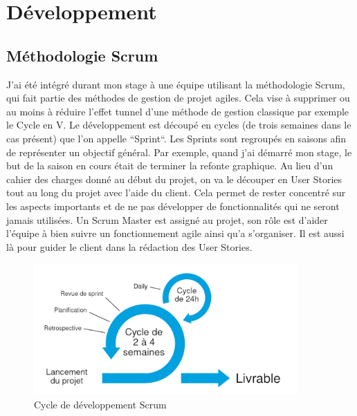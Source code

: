\documentclass[12pt, a4paper]{report}
\begin{document}
\chapter{Développement}
    \section{Méthodologie Scrum}
        J'ai été intégré durant mon stage à une équipe utilisant la méthodologie Scrum, qui fait partie des méthodes de gestion de projet agiles. Cela vise à supprimer ou au moins à réduire l'effet tunnel d'une méthode de gestion classique par exemple le Cycle en V.\newline
        Le développement est découpé en cycles (de trois semaines dans le cas présent) que l'on appelle ``Sprint``.\newline
        Les Sprints sont regroupés en saisons afin de représenter un objectif général.
        Par exemple, quand j'ai démarré mon stage, le but de la saison en cours était de terminer la refonte graphique.
        Au lieu d'un cahier des charges donné au début du projet, on va le découper en User Stories tout au long du projet avec l'aide du client.\newline
        Cela permet de rester concentré sur les aspects importants et de ne pas développer de fonctionnalités qui ne seront jamais utilisées.\newline
        Un Scrum Master est assigné au projet, son rôle est d'aider l'équipe à bien suivre un fonctionnement agile ainsi qu'a s'organiser. Il est aussi là pour guider le client dans la rédaction des User Stories.
        \begin{figure}[H]
            \begin{center}
                \includegraphics[width=0.9\textwidth]{scrum.jpg}
            \end{center}
            \caption{Cycle de développement Scrum}
        \end{figure}
\end{document}
